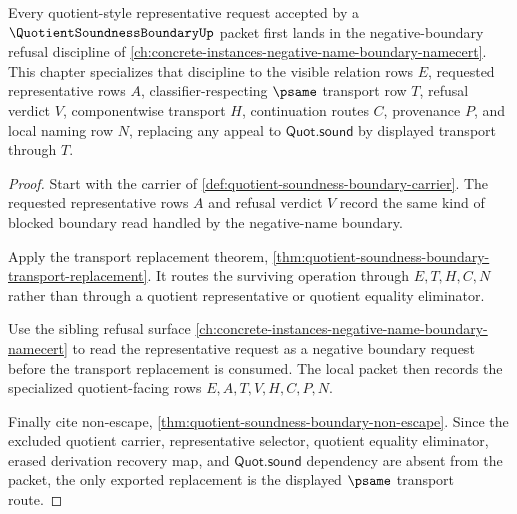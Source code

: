 \begin{theorem}
\label{thm:quotient-soundness-boundary-negative-refusal-dependency}
Every quotient-style representative request accepted by a $\QuotientSoundnessBoundaryUp$ packet first lands in the negative-boundary refusal discipline of \autoref{ch:concrete-instances-negative-name-boundary-namecert}. This chapter specializes that discipline to the visible relation rows $E$, requested representative rows $A$, classifier-respecting $\psame$ transport row $T$, refusal verdict $V$, componentwise transport $H$, continuation routes $C$, provenance $P$, and local naming row $N$, replacing any appeal to $\mathsf{Quot.sound}$ by displayed transport through $T$.
\end{theorem}
\begin{proof}
Start with the carrier of \autoref{def:quotient-soundness-boundary-carrier}. The requested representative rows $A$ and refusal verdict $V$ record the same kind of blocked boundary read handled by the negative-name boundary.

Apply the transport replacement theorem, \autoref{thm:quotient-soundness-boundary-transport-replacement}. It routes the surviving operation through $E,T,H,C,N$ rather than through a quotient representative or quotient equality eliminator.

Use the sibling refusal surface \autoref{ch:concrete-instances-negative-name-boundary-namecert} to read the representative request as a negative boundary request before the transport replacement is consumed. The local packet then records the specialized quotient-facing rows $E,A,T,V,H,C,P,N$.

Finally cite non-escape, \autoref{thm:quotient-soundness-boundary-non-escape}. Since the excluded quotient carrier, representative selector, quotient equality eliminator, erased derivation recovery map, and $\mathsf{Quot.sound}$ dependency are absent from the packet, the only exported replacement is the displayed $\psame$ transport route.
\end{proof}

